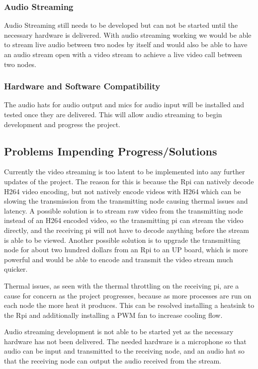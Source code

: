 \documentclass[onecolumn, draftclsnofoot,10pt, compsoc]{IEEEtran}
\begin{document}
\subsubsection{Audio Streaming}
	Audio Streaming still needs to be developed but can not be started until the necessary hardware is delivered. With audio streaming working we would be able to stream live audio between two nodes by itself and would also be able to have an audio stream open with a video stream to achieve a live video call between two nodes.

\subsubsection{Hardware and Software Compatibility}
	The audio hats for audio output and mics for audio input will be installed and tested once they are delivered. This will allow audio streaming to begin development and progress the project.	
	
	
\subsection{Problems Impending Progress/Solutions}
	Currently the video streaming is too latent to be implemented into any further updates of the project. The reason for this is because the Rpi can natively decode H264 video encoding, but not natively encode videos with H264 which can be slowing the transmission from the transmitting node causing thermal issues and latency. A possible solution is to stream raw video from the transmitting node instead of an H264 encoded video, so the transmitting pi can stream the video directly, and the receiving pi will not have to decode anything before the stream is able to be viewed. Another possible solution is to upgrade the transmitting node for about two hundred dollars from an Rpi to an UP board, which is more powerful and would be able to encode and transmit the video stream much quicker. 

	Thermal issues, as seen with the thermal throttling on the receiving pi, are a cause for concern as the project progresses, because as more processes are run on each node the more heat it produces. This can be resolved installing a heatsink to the Rpi and additionally installing a PWM fan to increase cooling flow.

	Audio streaming development is not able to be started yet as the necessary hardware has not been delivered. The needed hardware is a microphone so that audio can be input and transmitted to the receiving node, and an audio hat so that the receiving node can output the audio received from the stream.
\end{document}
